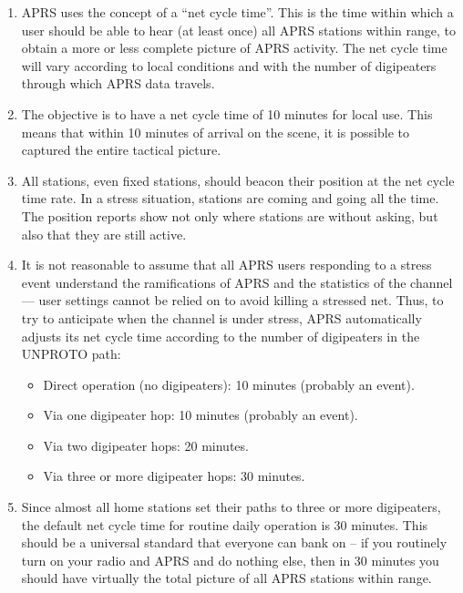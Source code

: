 \documentclass{scrreprt}[letter]
\begin{document}
\begin {enumerate}

\item APRS uses the concept of a “net cycle time”. This is the time within
which a user should be able to hear (at least once) all APRS stations
within range, to obtain a more or less complete picture of APRS activity.
The net cycle time will vary according to local conditions and with the
number of digipeaters through which APRS data travels.

\item The objective is to have a net cycle time of 10 minutes for local use. This
means that within 10 minutes of arrival on the scene, it is possible to
captured the entire tactical picture.

\item  All stations, even fixed stations, should beacon their position at the net
cycle time rate. In a stress situation, stations are coming and going all the
time. The position reports show not only where stations are without
asking, but also that they are still active.

\item It is not reasonable to assume that all APRS users responding to a stress
event understand the ramifications of APRS and the statistics of the
channel — user settings cannot be relied on to avoid killing a stressed
net. Thus, to try to anticipate when the channel is under stress, APRS
automatically adjusts its net cycle time according to the number of
digipeaters in the UNPROTO path:

\begin{itemize}

\item Direct operation (no digipeaters): 10 minutes (probably an
event).

\item Via one digipeater hop: 10 minutes (probably an event).

\item Via two digipeater hops: 20 minutes.

\item Via three or more digipeater hops: 30 minutes.

\end{itemize}

\item Since almost all home stations set their paths to three or more
digipeaters, the default net cycle time for routine daily operation is
30 minutes. This should be a universal standard that everyone can bank
on -- if you routinely turn on your radio and APRS and do nothing
else, then in 30 minutes you should have virtually the total picture
of all APRS stations within range.


\end{enumerate}
\end{document}
